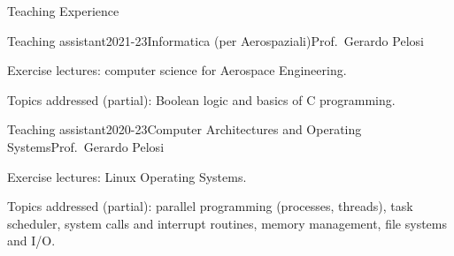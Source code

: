 \documentclass{resume} %
\begin{document}
\begin{rSection}{Teaching Experience}

  \begin{rSubsection}{Teaching assistant}{2021-23}{Informatica (per Aerospaziali)}{Prof.\ Gerardo Pelosi}
  \item Exercise lectures: computer science for Aerospace Engineering.
  \item Topics addressed (partial): Boolean logic and basics of C programming.
  \end{rSubsection}
  \begin{rSubsection}{Teaching assistant}{2020-23}{Computer Architectures and Operating Systems}{Prof.\ Gerardo Pelosi}
  \item Exercise lectures: Linux Operating Systems.
  \item Topics addressed (partial): parallel programming (processes, threads),
    task scheduler, system calls and interrupt routines, memory management, file
    systems and I/O.
  \end{rSubsection}



\end{rSection}
\end{document}
